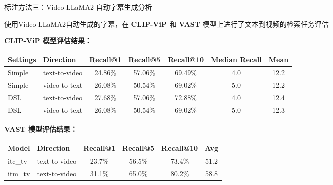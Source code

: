 \documentclass[serif]{beamer}
\begin{document}
\begin{frame}{标注方法三：Video-LLaMA2 自动字幕生成分析}

使用Video-LLaMA2自动生成的字幕，在 \textbf{CLIP-ViP} 和 \textbf{VAST} 模型上进行了文本到视频的检索任务评估

\vspace{0.4em}
\textbf{CLIP-ViP 模型评估结果：}

\vspace{0.5em} 
\normalsize
\scriptsize
\centering
\begin{tabular}{|l|l|c|c|c|c|c|}
\hline
\textbf{Settings} & \textbf{Direction} & \textbf{Recall@1} & \textbf{Recall@5} & \textbf{Recall@10} & \textbf{Median Recall} & \textbf{Mean} \\
\hline
Simple & text-to-video   & 24.86\% & 57.06\% & 69.49\% & 4.0 & 12.2 \\
Simple & video-to-text   & 26.08\% & 50.54\% & 69.02\% & 5.0 & 12.2 \\
\hline
DSL    & text-to-video   & 27.68\% & 57.06\% & 72.88\% & 4.0 & 12.4 \\
DSL    & video-to-text   & 26.08\% & 50.54\% & 69.02\% & 5.0 & 12.3 \\
\hline
\end{tabular}

\vspace{0.5em} %
\raggedright
\textbf{\normalsize VAST 模型评估结果：} %

\vspace{0.3em} 
\normalsize
\begin{center}
\begin{tabular}{|l|l|c|c|c|c|}
\hline
\textbf{Model} & \textbf{Direction} & \textbf{Recall@1} & \textbf{Recall@5} & \textbf{Recall@10} & \textbf{Avg} \\
\hline
itc\_tv & text-to-video & 23.7\% & 56.5\% & 73.4\% & 51.2 \\
itm\_tv & text-to-video & 31.1\% & 65.0\% & 80.2\% & 58.8 \\
\hline
\end{tabular}
\end{center}

\end{frame}
\end{document}
